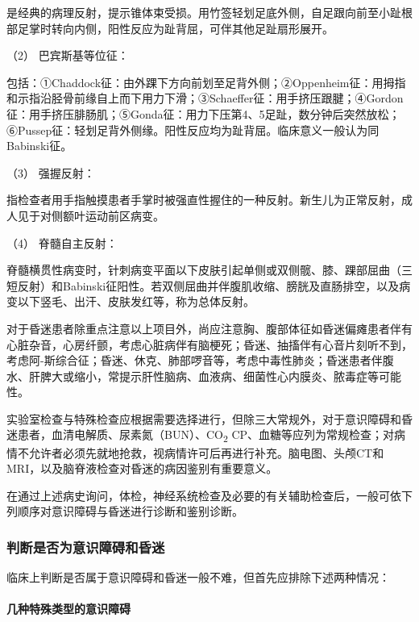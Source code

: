 是经典的病理反射，提示锥体束受损。用竹签轻划足底外侧，自足跟向前至小趾根部足掌时转向内侧，阳性反应为趾背屈，可伴其他足趾扇形展开。

\hypertarget{text00010.htmlux5cux23CHP1-2-2-1-3-6-2}{}
（2） 巴宾斯基等位征：

包括：①Chaddock征：由外踝下方向前划至足背外侧；②Oppenheim征：用拇指和示指沿胫骨前缘自上而下用力下滑；③Schaeffer征：用手挤压跟腱；④Gordon征：用手挤压腓肠肌；⑤Gonda征：用力下压第4、5足趾，数分钟后突然放松；⑥Pussep征：轻划足背外侧缘。阳性反应均为趾背屈。临床意义一般认为同Babinski征。

\hypertarget{text00010.htmlux5cux23CHP1-2-2-1-3-6-3}{}
（3） 强握反射：

指检查者用手指触摸患者手掌时被强直性握住的一种反射。新生儿为正常反射，成人见于对侧额叶运动前区病变。

\hypertarget{text00010.htmlux5cux23CHP1-2-2-1-3-6-4}{}
（4） 脊髓自主反射：

脊髓横贯性病变时，针刺病变平面以下皮肤引起单侧或双侧髋、膝、踝部屈曲（三短反射）和Babinski征阳性。若双侧屈曲并伴腹肌收缩、膀胱及直肠排空，以及病变以下竖毛、出汗、皮肤发红等，称为总体反射。

对于昏迷患者除重点注意以上项目外，尚应注意胸、腹部体征如昏迷偏瘫患者伴有心脏杂音，心房纤颤，考虑心脏病伴有脑梗死；昏迷、抽搐伴有心音片刻听不到，考虑阿-斯综合征；昏迷、休克、肺部啰音等，考虑中毒性肺炎；昏迷患者伴腹水、肝脾大或缩小，常提示肝性脑病、血液病、细菌性心内膜炎、脓毒症等可能性。

实验室检查与特殊检查应根据需要选择进行，但除三大常规外，对于意识障碍和昏迷患者，血清电解质、尿素氮（BUN）、CO\textsubscript{2}
CP、血糖等应列为常规检查；对病情不允许者必须先就地抢救，视病情许可后再进行补充。脑电图、头颅CT和MRI，以及脑脊液检查对昏迷的病因鉴别有重要意义。

在通过上述病史询问，体检，神经系统检查及必要的有关辅助检查后，一般可依下列顺序对意识障碍与昏迷进行诊断和鉴别诊断。

\subsubsection{判断是否为意识障碍和昏迷}

临床上判断是否属于意识障碍和昏迷一般不难，但首先应排除下述两种情况：

\paragraph{几种特殊类型的意识障碍}

